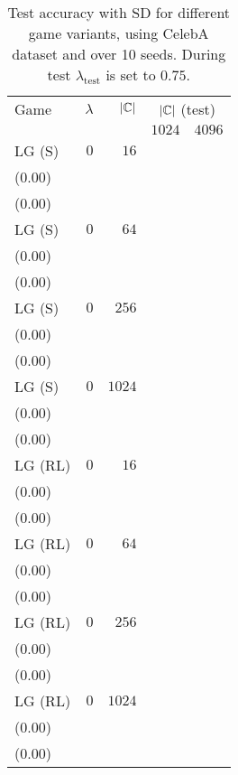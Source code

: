 \begin{table*}[t]
\linespread{0.6}\selectfont\centering
\centering
\caption{Test accuracy with SD for different game variants, using CelebA dataset and over 10 seeds. During test \(\lambda_{\text{test}}\) is set to \(0.75\).}
\label{table:lg_celeba_075_test_reward}
\begin{tabular}{lrrrr}
\toprule
Game & \(\lambda\) & \(|{\mathbb{C}}|\) & \multicolumn{2}{c}{\(|{\mathbb{C}}|\) (test)} \\[1ex]
 &  &  & \multicolumn{1}{c}{\(1024\)} & \multicolumn{1}{c}{\(4096\)} \\
\midrule
LG {\scriptsize(S)} & \(0\) & \(16\) & \longcell{\(0.00\)\\{\tiny(\(0.00\))}} & \longcell{\(0.00\)\\{\tiny(\(0.00\))}} \\[2.2ex]
LG {\scriptsize(S)} & \(0\) & \(64\) & \longcell{\(0.00\)\\{\tiny(\(0.00\))}} & \longcell{\(0.00\)\\{\tiny(\(0.00\))}} \\[2.2ex]
LG {\scriptsize(S)} & \(0\) & \(256\) & \longcell{\(0.00\)\\{\tiny(\(0.00\))}} & \longcell{\(0.00\)\\{\tiny(\(0.00\))}} \\[2.2ex]
LG {\scriptsize(S)} & \(0\) & \(1024\) & \longcell{\(0.01\)\\{\tiny(\(0.00\))}} & \longcell{\(0.00\)\\{\tiny(\(0.00\))}} \\[2.2ex]
LG {\scriptsize(RL)} & \(0\) & \(16\) & \longcell{\(0.01\)\\{\tiny(\(0.00\))}} & \longcell{\(0.00\)\\{\tiny(\(0.00\))}} \\[2.2ex]
LG {\scriptsize(RL)} & \(0\) & \(64\) & \longcell{\(0.01\)\\{\tiny(\(0.00\))}} & \longcell{\(0.00\)\\{\tiny(\(0.00\))}} \\[2.2ex]
LG {\scriptsize(RL)} & \(0\) & \(256\) & \longcell{\(0.01\)\\{\tiny(\(0.00\))}} & \longcell{\(0.00\)\\{\tiny(\(0.00\))}} \\[2.2ex]
LG {\scriptsize(RL)} & \(0\) & \(1024\) & \longcell{\(0.01\)\\{\tiny(\(0.00\))}} & \longcell{\(0.00\)\\{\tiny(\(0.00\))}} \\[2.2ex]

\end{tabular}
\end{table*}
